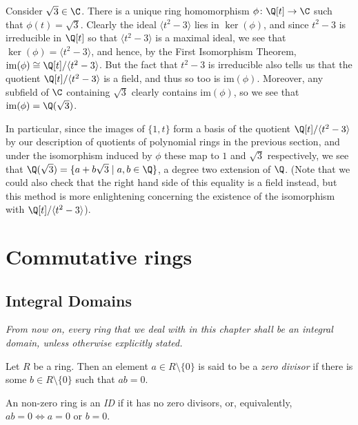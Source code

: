 \documentclass{maths}
\begin{document}
\begin{ex}
    Consider $\sqrt{3}\in\C$.
    There is a unique ring homomorphism $\phi\colon\Q[t]\to\C$ such that $\phi(t)=\sqrt{3}$.
    Clearly the ideal $\langle t^2-3\rangle$ lies in $\ker(\phi)$, and since $t^2-3$ is irreducible in $\Q[t]$ so that $\langle t^2-3\rangle$ is a maximal ideal, we see that $\ker(\phi)=\langle t^2-3\rangle$, and hence, by the First Isomorphism Theorem, $\mathrm{im}(\phi)\cong\Q[t]/\langle t^2-3\rangle$.
    But the fact that $t^2-3$ is irreducible also tells us that the quotient $\Q[t]/\langle t^2-3\rangle$ is a field, and thus so too is $\mathrm{im}(\phi)$.
    Moreover, any subfield of $\C$ containing $\sqrt{3}$ clearly contains $\mathrm{im}(\phi)$, so we see that $\mathrm{im}(\phi)=\Q(\sqrt{3})$.

    In particular, since the images of $\{1,t\}$ form a basis of the quotient $\Q[t]/\langle t^2-3\rangle$ by our description of quotients of polynomial rings in the previous section, and under the isomorphism induced by $\phi$ these map to $1$ and $\sqrt{3}$ respectively, we see that $\Q(\sqrt{3})=\{a+b\sqrt{3} \mid a,b\in\Q\}$, a degree two extension of $\Q$.
    (Note that we could also check that the right hand side of this equality is a field instead, but this method is more enlightening concerning the existence of the isomorphism with $\Q[t]/\langle t^2-3\rangle$).
\end{ex}

\section{Commutative rings}

\subsection{Integral Domains}

\emph{From now on, every ring that we deal with in this chapter shall be an integral domain, unless otherwise explicitly stated.}

\begin{defn}
    Let $R$ be a ring.
    Then an element $a\in R\setminus\{0\}$ is said to be a \emph{zero divisor} if there is some $b\in R\setminus\{0\}$ such that $ab=0$.
\end{defn}

\begin{defn}
    An non-zero ring is an \emph{ID} if it has no zero divisors, or, equivalently, $ab=0\iff a=0\text{ or }b=0$.
\end{defn}
\end{document}
